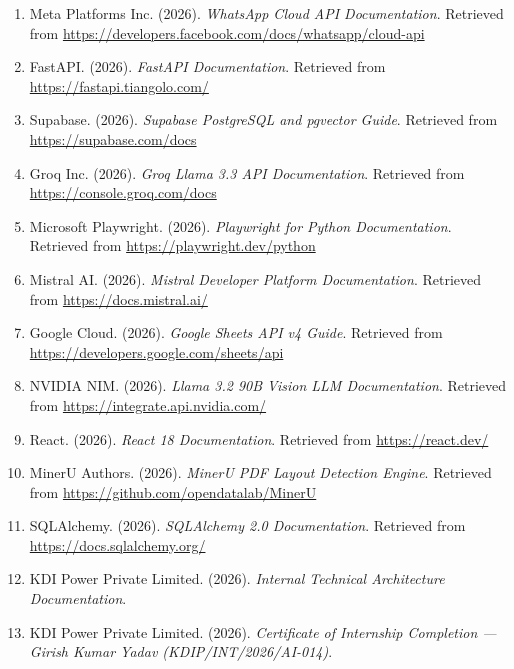 \documentclass[12pt,a4paper]{report}
\begin{document}
\begin{enumerate}[leftmargin=*,itemsep=4pt]
    \item Meta Platforms Inc. (2026). \textit{WhatsApp Cloud API Documentation}. Retrieved from \url{https://developers.facebook.com/docs/whatsapp/cloud-api}

    \item FastAPI. (2026). \textit{FastAPI Documentation}. Retrieved from \url{https://fastapi.tiangolo.com/}

    \item Supabase. (2026). \textit{Supabase PostgreSQL and pgvector Guide}. Retrieved from \url{https://supabase.com/docs}

    \item Groq Inc. (2026). \textit{Groq Llama 3.3 API Documentation}. Retrieved from \url{https://console.groq.com/docs}

    \item Microsoft Playwright. (2026). \textit{Playwright for Python Documentation}. Retrieved from \url{https://playwright.dev/python}

    \item Mistral AI. (2026). \textit{Mistral Developer Platform Documentation}. Retrieved from \url{https://docs.mistral.ai/}

    \item Google Cloud. (2026). \textit{Google Sheets API v4 Guide}. Retrieved from \url{https://developers.google.com/sheets/api}

    \item NVIDIA NIM. (2026). \textit{Llama 3.2 90B Vision LLM Documentation}. Retrieved from \url{https://integrate.api.nvidia.com/}

    \item React. (2026). \textit{React 18 Documentation}. Retrieved from \url{https://react.dev/}

    \item MinerU Authors. (2026). \textit{MinerU PDF Layout Detection Engine}. Retrieved from \url{https://github.com/opendatalab/MinerU}

    \item SQLAlchemy. (2026). \textit{SQLAlchemy 2.0 Documentation}. Retrieved from \url{https://docs.sqlalchemy.org/}

    \item KDI Power Private Limited. (2026). \textit{Internal Technical Architecture Documentation}.

    \item KDI Power Private Limited. (2026). \textit{Certificate of Internship Completion --- Girish Kumar Yadav (KDIP/INT/2026/AI-014)}.
\end{enumerate}
\end{document}
